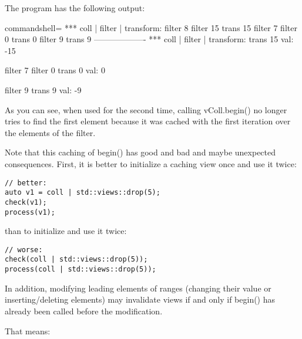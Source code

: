 The program has the following output:

{\footnotesize
\begin{tcblisting}{commandshell={}}
*** coll | filter | transform:
filter 8
filter 15
trans 15
filter 7
filter 0
trans 0
filter 9
trans 9
-------------------
*** coll | filter | transform:
trans 15
val: -15

filter 7
filter 0
trans 0
val: 0

filter 9
trans 9
val: -9
\end{tcblisting}
}

As you can see, when used for the second time, calling vColl.begin() no longer tries to find the first element because it was cached with the first iteration over the elements of the filter.

Note that this caching of begin() has good and bad and maybe unexpected consequences. First, it is better to initialize a caching view once and use it twice:

\begin{lstlisting}[style=styleCXX]
// better:
auto v1 = coll | std::views::drop(5);
check(v1);
process(v1);
\end{lstlisting}

than to initialize and use it twice:

\begin{lstlisting}[style=styleCXX]
// worse:
check(coll | std::views::drop(5));
process(coll | std::views::drop(5));
\end{lstlisting}

In addition, modifying leading elements of ranges (changing their value or inserting/deleting elements) may invalidate views if and only if begin() has already been called before the modification.

That means:

